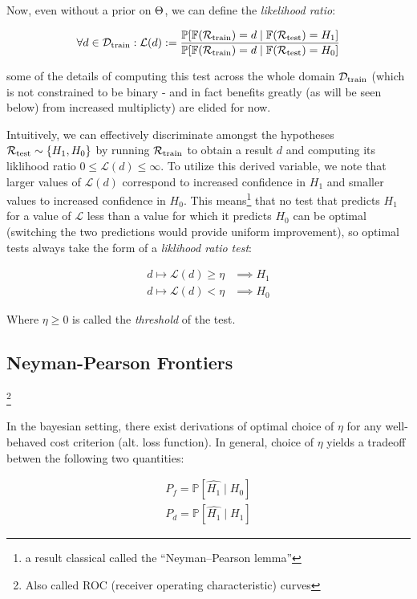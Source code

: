 \documentclass{article}
\begin{document}
Now, even without a prior on $\Theta$, we can define the \textit{likelihood ratio}:

\renewcommand{\L}{\mathcal{L}}

\begin{equation*}
  \forall d \in \Dtrain: \L(d) := \frac{\mathbb{P}[\F(\Rtrain) = d \mid \F(\Rtest) = H_1]}{\mathbb{P}[\F(\Rtrain) = d \mid \F(\Rtest) = H_0]}
\end{equation*}

some of the details of computing this test across the whole domain $\mathcal{D}_{\text{train}}$ (which is not constrained to be binary - and in fact benefits greatly (as will be seen below) from increased multiplicty) are elided for now.

Intuitively, we can effectively discriminate amongst the hypotheses $\mathcal{R}_{\text{test}} \sim \{H_1, H_0\}$ by running $\mathcal{R}_{\text{train}}$ to obtain a result $d$ and computing its liklihood ratio $0 \le \L(d) \le \infty$. To utilize this derived variable, we note that larger values of $\L(d)$ correspond to increased confidence in $H_1$ and smaller values to increased confidence in $H_0$. This means\footnote{a result classical called the ``Neyman–Pearson lemma''} that no test that predicts $H_1$ for a value of $\L$ less than a value for which it predicts $H_0$ can be optimal (switching the two predictions would provide uniform improvement), so optimal tests always take the form of a \textit{liklihood ratio test}:

\begin{align*}
  d \mapsto \L(d) \ge \eta &\implies H_1 \\
  d \mapsto \L(d) < \eta &\implies H_0
\end{align*}

Where $\eta \ge 0$ is called the \textit{threshold} of the test. 

\subsection{Neyman-Pearson Frontiers}

\footnote{Also called ROC (receiver operating characteristic) curves}

In the bayesian setting, there exist derivations of optimal choice of $\eta$ for any well-behaved cost criterion (alt. loss function). In general, choice of $\eta$ yields a tradeoff betwen the following two quantities:

\begin{align*}
  P_f = \mathbb{P}[\hat{H_1} \mid H_0] \\
  P_d = \mathbb{P}[\hat{H_1} \mid H_1]
\end{align*}
\end{document}

